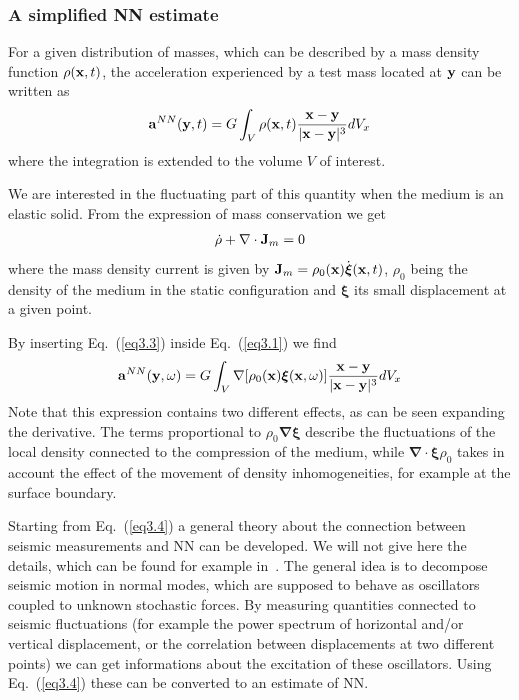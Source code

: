 \subsubsection{A simplified NN estimate}
\label{subsub:NNanalyticalestimation}

For a given distribution of masses, which can be described by a mass density
function $\rho({\bf x},t)$, the acceleration experienced by a test mass
located at ${\bf y}$ can be written as
\begin{eqnarray}
	{\bf a}^{NN}({\bf y},t)=G\int_{V}\rho({\bf x},t)
        \frac{\bf x-y}{|{\bf x-y}|^{3}}                        
        dV_{x}
	\label{eq3.1}
\end{eqnarray}
where the integration is extended to the volume $V$ of interest.

We are interested in the fluctuating part of this quantity when the medium is
an elastic solid. From the expression of mass conservation we get
\begin{eqnarray}
	\dot{\rho}+{\bf \nabla}\cdot{\bf J}_{m}=0
	\label{eq3.3}
\end{eqnarray}
where the mass density current is given by ${\bf J}_{m}=\rho_{0}({\bf
x})\dot{\boldsymbol \xi}({\bf x},t)$, $\rho_{0}$ being the density of the
medium in the static configuration and ${\boldsymbol \xi}$ its small
displacement at a given point.

By inserting Eq.~(\ref{eq3.3}) inside Eq.~(\ref{eq3.1}) we find
\begin{eqnarray}
	{\bf a}^{NN}({\bf y},\omega)=G\int_{V}\nabla[\rho_{0}({\bf
	x}){\boldsymbol \xi}({\bf x},\omega)]
        \frac{\bf x-y}{|{\bf x-y}|^{3}}                        
        dV_{x} \label{eq3.4}
\end{eqnarray}
Note that this expression contains two different effects, as can be seen
 expanding the derivative. The terms proportional to
 $\rho_{0}{\boldsymbol \nabla} {\boldsymbol \xi}$ describe the fluctuations of
 the local density connected to the compression of the medium, while
 ${\boldsymbol \nabla}\cdot{\boldsymbol \xi} \rho_{0}$ takes in account the
 effect of the movement of density inhomogeneities, for example at the surface
 boundary.

Starting from Eq.~(\ref{eq3.4}) a general theory about the connection between
seismic measurements and NN can be developed. We will not give here the
details, which can be found for example in~\cite{Beker2010GRG}. The general
idea is to decompose seismic motion in normal modes, which are supposed to
behave as oscillators coupled to unknown stochastic forces. By measuring
quantities connected to seismic fluctuations (for example the power spectrum
of horizontal and/or vertical displacement, or the correlation between
displacements at two different points) we can get informations about the
excitation of these oscillators. Using Eq.~(\ref{eq3.4}) these can be
converted to an estimate of NN.

